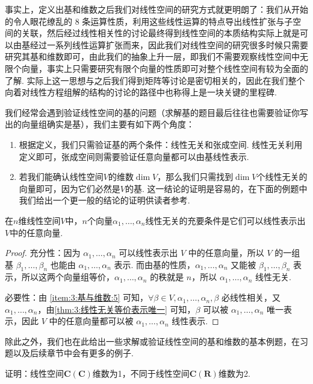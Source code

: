 事实上，定义出基和维数之后我们对线性空间的研究方式就更明朗了：我们从开始的令人眼花缭乱的 8 条运算性质，利用这些线性运算的特点导出线性扩张与子空间的关联，然后经过线性相关性的讨论最终得到线性空间的本质结构实际上就是可以由基经过一系列线性运算扩张而来，因此我们对线性空间的研究很多时候只需要研究其基和维数即可，由此我们的抽象上升一层，即我们不需要观察线性空间中无限个向量，事实上只需要研究有限个向量的性质即可对整个线性空间有较为全面的了解. 实际上这一思想与之后我们得到矩阵等讨论是密切相关的，因此在我们整个向着对线性方程组解的结构的讨论的路径中也称得上是一块关键的里程碑.

我们经常会遇到验证线性空间的基的问题（求解基的题目最后往往也需要验证你写出的向量组确实是基），我们主要有如下两个角度：
\begin{enumerate}
    \item 根据定义，我们只需验证基的两个条件：线性无关和张成空间. 线性无关利用定义即可，张成空间则需要验证任意向量都可以由基线性表示.

    \item 若我们能确认线性空间$V$的维数$\dim V$，那么我们只需找到$\dim V$个线性无关的向量即可，因为它们必然是$V$的基. 这一结论的证明是容易的，在下面的例题中我们给出一个更一般的结论的证明供读者参考.
\end{enumerate}

\begin{example}
    在$n$维线性空间$V$中，$n$个向量$\alpha_1,\ldots,\alpha_n$线性无关的充要条件是它们可以线性表示出$V$中的任意向量.
\end{example}

\begin{proof}
    充分性：因为 $\alpha_1,\ldots,\alpha_n$ 可以线性表示出 $V$ 中的任意向量，所以 $V$ 的一组基 $\beta_1, \ldots, \beta_n$ 也能由 $\alpha_1,\ldots,\alpha_n$ 表示. 而由基的性质，$\alpha_1,\ldots,\alpha_n$ 又能被 $\beta_1, \ldots, \beta_n$ 表示，所以这两个向量组等价，$\alpha_1,\ldots,\alpha_n$ 的秩就是 $n$，所以 $\alpha_1,\ldots,\alpha_n$ 线性无关.

    必要性：由 \ref*{item:3:基与维数:5} 可知，$\forall \beta \in V, \alpha_1, \ldots, \alpha_n, \beta$ 必线性相关，又 $\alpha_1,\ldots,\alpha_n$，由\autoref{thm:3:线性无关等价表示唯一} 可知，$\beta$ 可以被 $\alpha_1,\ldots,\alpha_n$ 唯一表示，因此 $V$ 中的任意向量都可以被 $\alpha_1,\ldots,\alpha_n$ 线性表示.
\end{proof}

除此之外，我们也在此给出一些求解或验证线性空间的基和维数的基本例题，在习题以及后续章节中会有更多的例子.
\begin{example}\label{ex:3:不同数域的维数}
    证明：线性空间$\mathbf{C}(\mathbf{C})$维数为1，不同于线性空间$\mathbf{C}(\mathbf{R})$维数为2.
\end{example}

